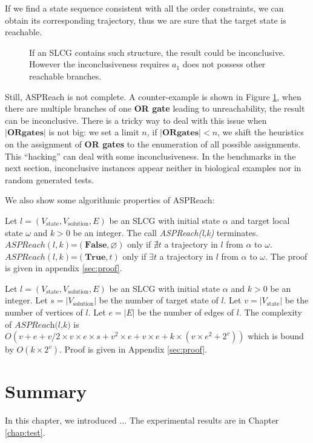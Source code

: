 If we find a state sequence consistent with all the order constraints, we can obtain its corresponding trajectory, thus we are sure that the target state is reachable.

\begin{figure}[ht]
    \centering
    
    \caption[Counterexample of ASPReach]{If an SLCG contains such structure, the result could be inconclusive.
    However the inconclusiveness requires $a_1$ does not possess other reachable branches.}
    \label{fig:lcgInconc}
\end{figure}
Still, ASPReach is not complete.
A counter-example is shown in Figure \ref{fig:lcgInconc}, when there are multiple branches of one \textbf{OR gate} leading to unreachability, the result can be inconclusive.
There is a tricky way to deal with this issue when $\mathbf{|OR gates|}$ is not big: we set a limit $n$, if $\mathbf{|OR gates|}<n$, we shift the heuristics on the assignment of \textbf{OR gates} to the enumeration of all possible assignments.
This ``hacking'' can deal with some inconclusiveness.
In the benchmarks in the next section, inconclusive instances appear neither in biological examples nor in random generated tests.

We also show some algorithmic properties of ASPReach:

\begin{theorem}

    Let $l=(V_{\mathrm{state}}, V_{\mathrm{solution}}, E)$ be an SLCG with initial state $\alpha$ and target local state $\omega$ and $k > 0$ be an integer.
    The call \textit{ASPReach(l,k)} terminates.\\
    $ASPReach(l,k)$=$(\mathbf{False},\varnothing)$ only if $\nexists t$ a trajectory in $l$ from $\alpha$ to $\omega$.\\
    $ASPReach(l,k)$=$(\mathbf{True},t)$ only if $\exists t$ a trajectory in $l$ from $\alpha$ to $\omega$.
    The proof is given in appendix \ref{sec:proof}.
\end{theorem}

\begin{theorem}
    Let $l=(V_{\mathrm{state}}, V_{\mathrm{solution}}, E)$ be an SLCG with initial state $\alpha$ and $k > 0$ be an integer.
    Let $s=|V_{\mathrm{solution}}|$ be the number of target state of $l$.
    Let $v = |V_{\mathrm{state}}|$ be the number of vertices of $l$.
    Let $e=|E|$ be the number of edges of $l$.
    The complexity of $\textit{ASPReach(l,k)}$ is $O(v + e + v/2 \times v \times e \times s + v^{2} \times e + v \times e + k \times (v \times e^{2} + 2^{v}))$ which is bound by $O(k \times 2^{v})$.
    Proof is given in Appendix \ref{sec:proof}.
\end{theorem}
\section{Summary}
In this chapter, we introduced ...
The experimental results are in Chapter \ref{chap:test}.